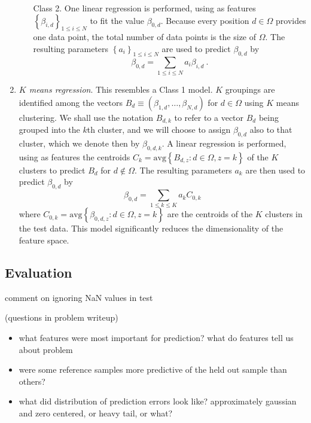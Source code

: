 \documentclass{article} %
\begin{document}
\begin{enumerate}
\begin{itemize}
\item [Class 2.] One linear regression is performed, using as features $\left\{ \beta_{i,d} \right\}_{1\leq i \leq N}$ to fit the value $\beta_{0,d}$. Because every position $d \in \Omega$ provides one data point, the total number of data points is the size of $\Omega$. The resulting parameters $\left\{ a_{i}\right\}_{1\leq i \leq N}$ are used to predict $\beta_{0,d}$ by
\begin{equation} \label{beta.samples} \beta_{0,d} = \sum_{1 \leq i \leq N} a_i \beta_{i,d} \ .\end{equation}
\end{itemize}


\item \emph{$K$ means regression}. This resembles a Class 1 model. $K$ groupings are identified among the vectors $B_d \equiv \left(\beta_{1,d},\dots,\beta_{N,d}\right)$ for $d\in\Omega$ using $K$ means clustering. We shall use the notation $B_{d,k}$ to refer to a vector $B_d$ being grouped into the $k$th cluster, and we will choose to assign $\beta_{0,d}$ also to that cluster, which we denote then by $\beta_{0,d,k}$. A linear regression is performed, using as features the centroids $C_k = \text{avg}\left\{B_{d,z} : d \in \Omega, z = k\right\}$ of the $K$ clusters to predict $B_{d}$ for $d \notin \Omega$. The resulting parameters $a_k$ are then used to predict $\beta_{0,d}$ by
\[ \beta_{0,d} = \sum_{1 \leq k \leq K} a_k C_{0,k}\]
where $C_{0,k} = \text{avg}\left\{\beta_{0,d,z} : d \in \Omega, z = k\right\}$ are the centroids of the $K$ clusters in the test data. This model significantly reduces the dimensionality of the feature space.
\end{enumerate}

\subsection{Evaluation}

comment on ignoring NaN values in test

(questions in problem writeup)
\begin{itemize}
\item what features were most important for prediction? what do features tell us about problem
\item were some reference samples more predictive of the held out sample than others?
\item what did distribution of prediction errors look like? approximately gaussian and zero centered, or heavy tail, or what?
\end{itemize}
\end{document}
